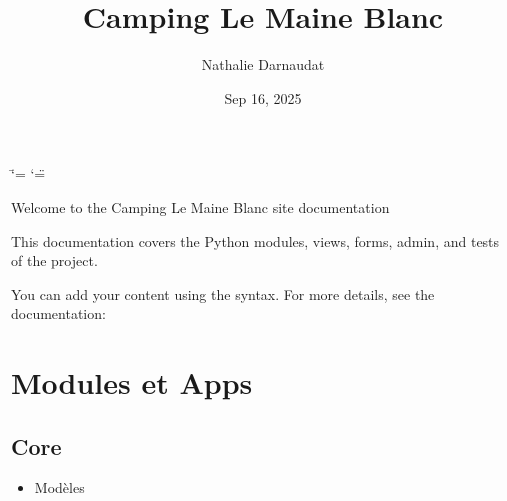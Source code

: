 \documentclass[letterpaper,10pt,english]{sphinxmanual}
\title{Camping Le Maine Blanc}
\date{Sep 16, 2025}
\author{Nathalie Darnaudat}
\begin{document}
\ifdefined\shorthandoff
  \ifnum\catcode`\=\string=\active\shorthandoff{=}\fi
  \ifnum\catcode`\"=\active{}\fi
\fi

\pagestyle{empty}
\sphinxmaketitle
\pagestyle{plain}
\sphinxtableofcontents
\pagestyle{normal}
\label{\detokenize{index::doc}}


\sphinxAtStartPar
Welcome to the Camping Le Maine Blanc site documentation

\sphinxAtStartPar
This documentation covers the Python modules, views, forms, admin, and tests of the project.

\sphinxAtStartPar
You can add your content using the  syntax.
For more details, see the documentation:


\chapter{Modules et Apps}
\label{\detokenize{index:modules-et-apps}}

\section{Core}
\label{\detokenize{index:core}}\begin{itemize}
\item {} 
\sphinxAtStartPar
Modèles

\end{itemize}
\label{\detokenize{index:module-core.models}}
\end{document}
